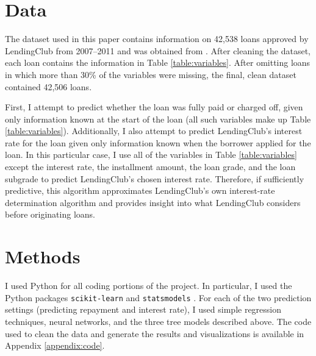 \documentclass[12pt]{article}
\begin{document}


\section{Data}

The dataset used in this paper contains information on 42,538 loans approved by LendingClub from 2007--2011 and was obtained from \cite{lendingclub}. After cleaning the dataset, each loan contains the information in Table \ref{table:variables}. After omitting loans in which more than 30\% of the variables were missing, the final, clean dataset contained 42,506 loans.



First, I attempt to predict whether the loan was fully paid or charged off, given only information known at the start of the loan (all such variables make up Table \ref{table:variables}). Additionally, I also attempt to predict LendingClub's interest rate for the loan given only information known when the borrower applied for the loan. In this particular case, I use all of the variables in Table \ref{table:variables} except the interest rate, the installment amount, the loan grade, and the loan subgrade to predict LendingClub's chosen interest rate. Therefore, if sufficiently predictive, this algorithm approximates LendingClub's own interest-rate determination algorithm and provides insight into what LendingClub considers before originating loans. 

\section{Methods}

I used Python for all coding portions of the project. In particular, I used the Python packages \texttt{scikit-learn} \cite{pedregosa2011scikit} and \texttt{statsmodels} \cite{seabold2010statsmodels}. For each of the two prediction settings (predicting repayment and interest rate), I used simple regression techniques, neural networks, and the three tree models described above. The code used to clean the data and generate the results and visualizations is available in Appendix \ref{appendix:code}.
\end{document}
